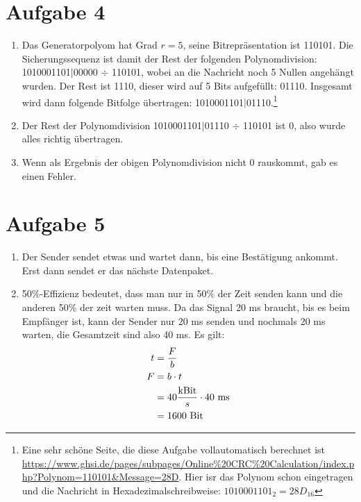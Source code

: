\documentclass{article}
\begin{document}
	\section*{Aufgabe 4}
	\begin{enumerate}[label=(\alph*)]
		\item Das Generatorpolyom hat Grad $r=5$, seine Bitrepräsentation ist 110101. Die Sicherungssequenz ist damit der Rest der folgenden Polynomdivision: 1010001101$\vert$00000 $\div$ 110101, wobei an die Nachricht noch 5 Nullen angehängt wurden. Der Rest ist 1110, dieser wird auf 5 Bits aufgefüllt: 01110. Insgesamt wird dann folgende Bitfolge übertragen: 1010001101$\vert$01110.\footnote{Eine sehr schöne Seite, die diese Aufgabe vollautomatisch berechnet ist \url{https://www.ghsi.de/pages/subpages/Online\%20CRC\%20Calculation/index.php?Polynom=110101\&Message=28D}. Hier isr das Polynom schon eingetragen und die Nachricht in Hexadezimalschreibweise: $1010001101_2 = 28D_{16}$}
		\item Der Rest der Polynomdivision 1010001101$\vert$01110 $\div$ 110101 ist 0, also wurde alles richtig übertragen.
		\item Wenn als Ergebnis der obigen Polynomdivision nicht 0 rauskommt, gab es einen Fehler.
	\end{enumerate}

	\section*{Aufgabe 5}
	\begin{enumerate}[label=(\alph*)]
		\item Der Sender sendet etwas und wartet dann, bis eine Bestätigung ankommt. Erst dann sendet er das nächste Datenpaket.
		\item 50\%-Effizienz bedeutet, dass man nur in 50\% der Zeit senden kann und die anderen 50\% der zeit warten muss. Da das Signal 20 ms braucht, bis es beim Empfänger ist, kann der Sender nur 20 ms senden und nochmals 20 ms warten, die Gesamtzeit sind also 40 ms. Es gilt:
		\begin{align}
			t &= \frac{F}{b} \notag \\
			F &= b\cdot t \notag \\
			&= 40\frac{\text{kBit}}{s}\cdot 40\text{ ms} \notag \\
			&= 1600\text{ Bit} \notag
		\end{align}
	\end{enumerate}
	
\end{document}
